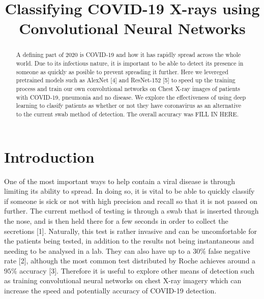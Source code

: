 \documentclass[conference,compsoc]{IEEEtran}
\begin{document}
%
\title{Classifying COVID-19 X-rays using Convolutional Neural Networks}


\author{
}

\maketitle

\begin{abstract}
A defining part of 2020 is COVID-19 and how it has rapidly spread across the whole world.
Due to its infectious nature, it is important to be able to detect its presence in someone as quickly as
posible to prevent spreading it further. Here we levereged pretrained models such as AlexNet [4] and ResNet-152 [5]
to speed up the training process and train our own convolutional networks on Chest X-ray images of patients
with COVID-19, pneumonia and no disease. We explore the effectiveness of using deep learning to clasify patients
as whether or not they have coronavirus as an alternative to the current swab method of detection.
The overall accuracy was FILL IN HERE.
\end{abstract}

\IEEEpeerreviewmaketitle

\section{Introduction}
One of the most important ways to help contain a viral disease is through limiting its ability to spread. 
In doing so, it is vital to be able to quickly classify if someone is sick or not with high precision and recall so that it is not passed on further. 
The current method of testing is through a swab that is inserted through the nose, and is then held there for a few seconds in order 
to collect the secretions [1]. Naturally, this test is rather invasive and can be uncomfortable for the patients being tested, 
in addition to the results not being instantaneous and needing to be analysed in a lab. They can also have up to a $30\%$ false negative
rate [2], although the most common test distributed by Roche achieves around a $95\%$ accuracy [3]. Therefore it is useful to explore 
other means of detection such as training convolutional neural networks on chest X-ray imagery which can increase the speed and
potentially accuracy of COVID-19 detection.
\end{document}
